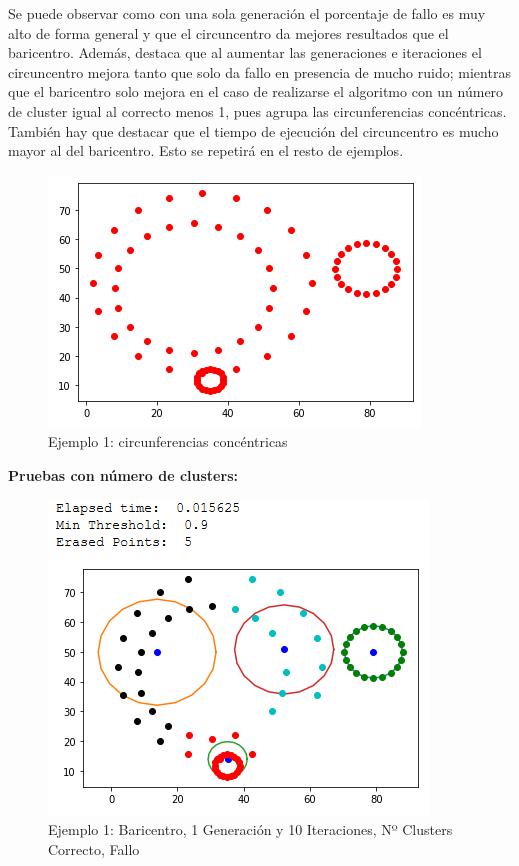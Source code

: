 \documentclass[conference,a4paper]{IEEEtran}
\begin{document}
Se puede observar como con una sola generación el porcentaje de fallo es muy alto de forma general y que el circuncentro da mejores resultados que el baricentro. Además, destaca que al aumentar las generaciones e iteraciones el circuncentro mejora tanto que solo da fallo en presencia de mucho ruido; mientras que el baricentro solo mejora en el caso de realizarse el algoritmo con un número de cluster igual al correcto menos 1, pues agrupa las circunferencias concéntricas. También hay que destacar que el tiempo de ejecución del circuncentro es mucho mayor al del baricentro. Esto se repetirá en el resto de ejemplos.

\begin{figure}[H]
\centering
\includegraphics[scale=0.65]{Experimentacion/Ejemplo1/Ejemplo1}
\caption{Ejemplo 1: circunferencias concéntricas\\}
\end{figure}

\textbf{Pruebas con número de clusters:}\\

\begin{figure}[H]
\centering
\includegraphics[scale=0.65]{Experimentacion/Ejemplo1/ej1_b_1_10_cc}
\caption{Ejemplo 1: Baricentro, 1 Generación y 10 Iteraciones,  Nº Clusters Correcto, Fallo\\}
\end{figure}
\end{document}
